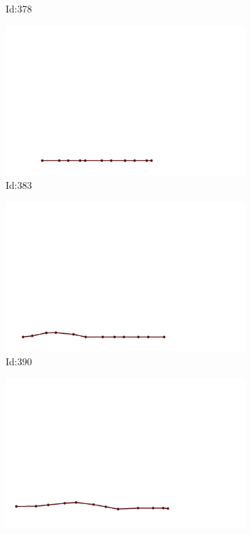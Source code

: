 \documentclass[12pt,twoside]{report}
\begin{document}
\begin{figure}
\begin{subfigure}[b]{0.20\textwidth}
\caption{Id:378}
\end{subfigure}
\begin{subfigure}[b]{0.20\textwidth}
\centering
\includegraphics[width=\textwidth]{../trajectories/383.png}
\caption{Id:383}
\end{subfigure}
\begin{subfigure}[b]{0.20\textwidth}
\centering
\includegraphics[width=\textwidth]{../trajectories/390.png}
\caption{Id:390}
\end{subfigure}
\begin{subfigure}[b]{0.20\textwidth}
\centering
\includegraphics[width=\textwidth]{../trajectories/474.png}

\end{subfigure}
\end{figure}
\end{document}
